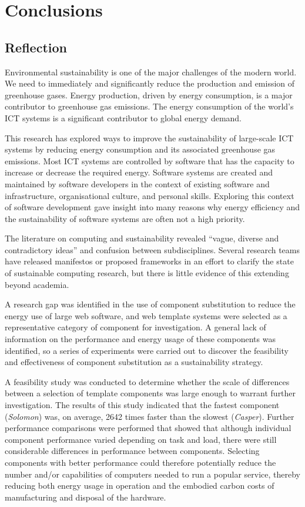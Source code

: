 \chapter{Conclusions}
\label{chapter:conclusions}

\section{Reflection}
\label{conclusions:reflection}

Environmental sustainability is one of the major challenges of the modern world. We need to immediately and significantly reduce the production and emission of greenhouse gases. Energy production, driven by energy consumption, is a major contributor to greenhouse gas emissions. The energy consumption of the world's \gls{ICT} systems is a significant contributor to global energy demand.

This research has explored ways to improve the sustainability of large-scale \gls{ICT} systems by reducing energy consumption and its associated greenhouse gas emissions. Most \gls{ICT} systems are controlled by software that has the capacity to increase or decrease the required energy. Software systems are created and maintained by software developers in the context of existing software and infrastructure, organisational culture, and personal skills. Exploring this context of software development gave insight into many reasons why energy efficiency and the sustainability of software systems are often not a high priority.

The literature on computing and sustainability revealed \enquote{vague, diverse and contradictory ideas} and confusion between subdisciplines. Several research teams have released manifestos or proposed frameworks in an effort to clarify the state of sustainable computing research, but there is little evidence of this extending beyond academia.

A research gap was identified in the use of component substitution to reduce the energy use of large web software, and web template systems were selected as a representative category of component for investigation. A general lack of information on the performance and energy usage of these components was identified, so a series of experiments were carried out to discover the feasibility and effectiveness of component substitution as a sustainability strategy.

A feasibility study was conducted to determine whether the scale of differences between a selection of template components was large enough to warrant further investigation. The results of this study indicated that the fastest component (\emph{Solomon}) was, on average, 2642 times faster than the slowest (\emph{Casper}). Further performance comparisons were performed that showed that although individual component performance varied depending on task and load, there were still considerable differences in performance between components. Selecting components with better performance could therefore potentially reduce the number and/or capabilities of computers needed to run a popular service, thereby reducing both energy usage in operation and the embodied carbon costs of manufacturing and disposal of the hardware.

